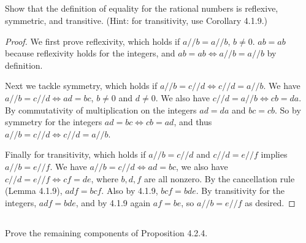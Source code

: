 \documentclass[../../main.tex]{subfiles}
\begin{document}

\subsection{}
\begin{q}
    Show that the definition of equality for the rational numbers is reflexive, symmetric, and transitive. (Hint: for transitivity, use Corollary 4.1.9.)
\end{q}

\begin{proof}
    We first prove reflexivity, 
    which holds if $a // b = a // b$, $b \neq 0$.
    $ab=ab$ because reflexivity holds for the integers, 
    and $ab=ab \iff a // b = a // b$ by definition.

    Next we tackle symmetry, 
    which holds if  $a // b = c // d \iff c // d = a // b$. 
    We have $a // b = c // d \iff ad = bc$, $b \neq 0$ and $d \neq 0$.
    We also have $c // d = a // b \iff cb = da$. 
    By commutativity of multiplication on the integers $ad = da$ and $bc = cb$.
    So by symmetry for the integers $ad = bc \iff cb = ad$, 
    and thus $a // b = c // d \iff c // d = a // b$.     

    Finally for transitivity, which holds if $a // b = c // d$ and $c // d = e // f$ implies $a // b = e // f$.
    We have $a // b = c // d \iff ad = bc$,
    we also have $c // d = e // f \iff cf = de$,
    where $b, d, f$ are all nonzero.
    By the cancellation rule (Lemma 4.1.9), $adf = bcf$.
    Also by 4.1.9, $bcf = bde$.
    By transitivity for the integers, $adf = bde$, 
    and by 4.1.9 again $af = be$,
    so $a // b = e // f$ as desired.
\end{proof}
\pagebreak

\addtocounter{subsection}{1}
\subsection{}
\begin{q}
    Prove the remaining components of Proposition 4.2.4.    
\end{q}
\end{document}
